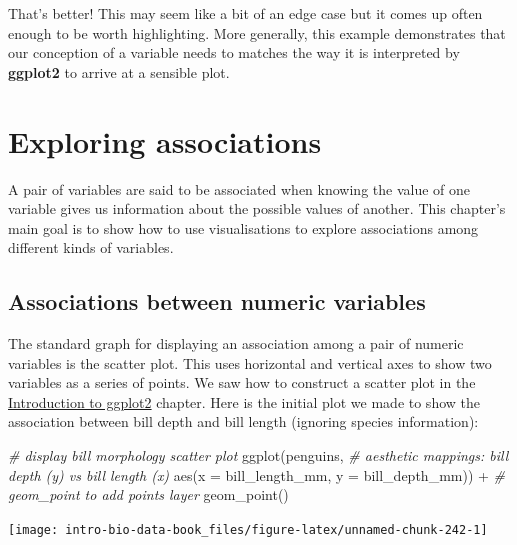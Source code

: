 \documentclass[
]{book}
\newenvironment{Shaded}{\begin{snugshade}}{\end{snugshade}}
\newcommand{\AttributeTok}[1]{\textcolor[rgb]{0.77,0.63,0.00}{#1}}
\newcommand{\CommentTok}[1]{\textcolor[rgb]{0.56,0.35,0.01}{\textit{#1}}}
\newcommand{\FunctionTok}[1]{\textcolor[rgb]{0.00,0.00,0.00}{#1}}
\newcommand{\NormalTok}[1]{#1}
\newcommand{\SpecialCharTok}[1]{\textcolor[rgb]{0.00,0.00,0.00}{#1}}
\begin{document}
That's better! This may seem like a bit of an edge case but it comes up often enough to be worth highlighting. More generally, this example demonstrates that our conception of a variable needs to matches the way it is interpreted by \textbf{ggplot2} to arrive at a sensible plot.

\hypertarget{exploring-associations}{%
\chapter{Exploring associations}\label{exploring-associations}}

A pair of variables are said to be associated when knowing the value of one variable gives us information about the possible values of another. This chapter's main goal is to show how to use visualisations to explore associations among different kinds of variables.

\hypertarget{numeric-association}{%
\section{Associations between numeric variables}\label{numeric-association}}

The standard graph for displaying an association among a pair of numeric variables is the scatter plot. This uses horizontal and vertical axes to show two variables as a series of points. We saw how to construct a scatter plot in the \protect\hyperlink{chapter-ggplot2-intro}{Introduction to ggplot2} chapter. Here is the initial plot we made to show the association between bill depth and bill length (ignoring species information):

\begin{Shaded}
\begin{Highlighting}[]
\CommentTok{\# display bill morphology scatter plot}
\FunctionTok{ggplot}\NormalTok{(penguins,}
       \CommentTok{\# aesthetic mappings: bill depth (y) vs bill length (x)}
       \FunctionTok{aes}\NormalTok{(}\AttributeTok{x =}\NormalTok{ bill\_length\_mm, }\AttributeTok{y =}\NormalTok{ bill\_depth\_mm)) }\SpecialCharTok{+} 
  \CommentTok{\# geom\_point to add points layer}
  \FunctionTok{geom\_point}\NormalTok{()}
\end{Highlighting}
\end{Shaded}

\begin{center}\texttt{[image: intro-bio-data-book\_files/figure-latex/unnamed-chunk-242-1]} \end{center}
\end{document}
